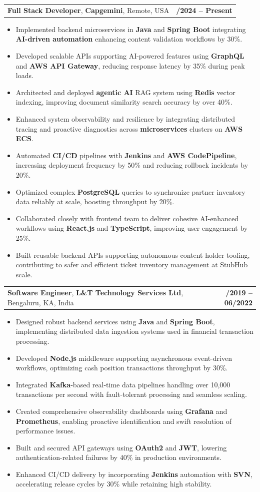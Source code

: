 \documentclass[letterpaper,11pt]{article}
\makeatletter
\newcommand{\resumeItem}[1]{
  \item\footnotesize{
    {#1 \vspace{-2pt}}
  }
}
\newcommand{\resumeSubheading}[4]{
  \vspace{-2pt}\item
    \begin{tabular*}{1.0\textwidth}[t]{l@{\extracolsep{\fill}}r}
      \textbf{\fontsize{10pt}{14pt}\selectfont #3}, \textbf{\fontsize{10pt}{14pt}\selectfont #1}, \fontsize{10pt}{14pt}\selectfont #4 & \textbf{\fontsize{10pt}{14pt}\selectfont #2} \\
    \end{tabular*}\vspace{-7pt}
}
\newcommand{\resumeItemListStart}{\begin{itemize}[leftmargin=*]}
\newcommand{\resumeItemListEnd}{\end{itemize}\vspace{-5pt}}
\makeatother
\begin{document}
    \resumeSubheading
        {Capgemini}{01/2024 -- Present}
        {Full Stack Developer}{Remote, USA}
      \resumeItemListStart
        \resumeItem{Implemented backend microservices in \textbf{Java} and \textbf{Spring Boot} integrating \textbf{AI-driven automation} enhancing content validation workflows by 30\%.}
        \resumeItem{Developed scalable APIs supporting AI-powered features using \textbf{GraphQL} and \textbf{AWS API Gateway}, reducing response latency by 35\% during peak loads.}
        \resumeItem{Architected and deployed \textbf{agentic AI} RAG system using \textbf{Redis} vector indexing, improving document similarity search accuracy by over 40\%.}
        \resumeItem{Enhanced system observability and resilience by integrating distributed tracing and proactive diagnostics across \textbf{microservices} clusters on \textbf{AWS ECS}.}
        \resumeItem{Automated \textbf{CI/CD} pipelines with \textbf{Jenkins} and \textbf{AWS CodePipeline}, increasing deployment frequency by 50\% and reducing rollback incidents by 20\%.}
        \resumeItem{Optimized complex \textbf{PostgreSQL} queries to synchronize partner inventory data reliably at scale, boosting throughput by 20\%.}
        \resumeItem{Collaborated closely with frontend team to deliver cohesive AI-enhanced workflows using \textbf{React.js} and \textbf{TypeScript}, improving user engagement by 25\%.}
        \resumeItem{Built reusable backend APIs supporting autonomous content holder tooling, contributing to safer and efficient ticket inventory management at StubHub scale.}
      \resumeItemListEnd

    \resumeSubheading
        {L\&T Technology Services Ltd}{08/2019 -- 06/2022}
        {Software Engineer}{Bengaluru, KA, India}
      \resumeItemListStart
        \resumeItem{Designed robust backend services using \textbf{Java} and \textbf{Spring Boot}, implementing distributed data ingestion systems used in financial transaction processing.}
        \resumeItem{Developed \textbf{Node.js} middleware supporting asynchronous event-driven workflows, optimizing cash position transactions throughput by 30\%.}
        \resumeItem{Integrated \textbf{Kafka}-based real-time data pipelines handling over 10,000 transactions per second with fault-tolerant processing and seamless scaling.}
        \resumeItem{Created comprehensive observability dashboards using \textbf{Grafana} and \textbf{Prometheus}, enabling proactive identification and swift resolution of performance issues.}
        \resumeItem{Built and secured API gateways using \textbf{OAuth2} and \textbf{JWT}, lowering authentication-related failures by 40\% in production environments.}
        \resumeItem{Enhanced CI/CD delivery by incorporating \textbf{Jenkins} automation with \textbf{SVN}, accelerating release cycles by 30\% while retaining high stability.}
      \resumeItemListEnd
\end{document}
